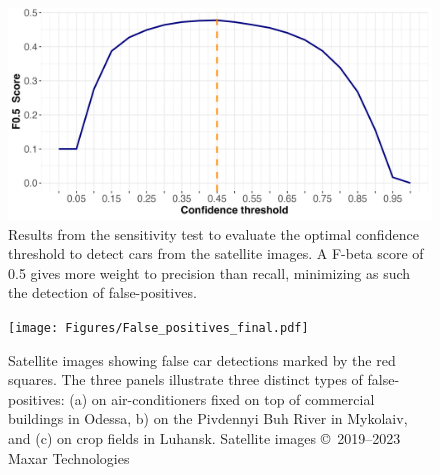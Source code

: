 \documentclass[sn-basic]{sn-jnl}%
\begin{document}
{\begin{appendices}
\begin{figure}[htbp]
\begin{center}
\includegraphics[width=\textwidth]{Figures/Confidence_threshold_experiment.jpg}
\end{center}
\caption{Results from the sensitivity test to evaluate the optimal confidence threshold to detect cars from the satellite images. A F-beta score of 0.5 gives more weight to precision than recall, minimizing as such the detection of false-positives.}
\label{figSM_Threshold}
\end{figure}


\begin{figure}[h!]
\begin{center}
\texttt{[image: Figures/False\_positives\_final.pdf]}
\end{center}
\caption{Satellite images showing  false car detections marked by the red squares. The three panels illustrate three distinct types of false-positives: (a) on air-conditioners fixed on top of commercial buildings in Odessa, b) on the Pivdennyi Buh River in Mykolaiv, and (c) on crop fields in Luhansk. Satellite images \copyright ~2019--2023 Maxar Technologies}
\label{figSM_FalsePositives}
\end{figure}


\end{appendices}}
\end{document}
